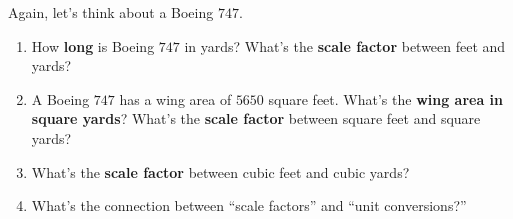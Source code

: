 \documentclass[handout,nooutcomes,noauthor,hints]{ximera}
\begin{document}
\begin{question}
  Again, let's think about a Boeing $747$.
  \begin{enumerate}
  \item How \textbf{long} is Boeing $747$ in yards? What's the \textbf{scale factor} between feet and yards?
  \item A Boeing $747$ has a wing area of $5650$ square feet. What's the
    \textbf{wing area in square yards}? What's the \textbf{scale factor} between square
    feet and square yards?
  \item What's the \textbf{scale factor} between cubic feet and cubic yards?
  \item What's the connection between ``scale factors'' and ``unit conversions?''
  \end{enumerate}
\end{question}

\end{document}
